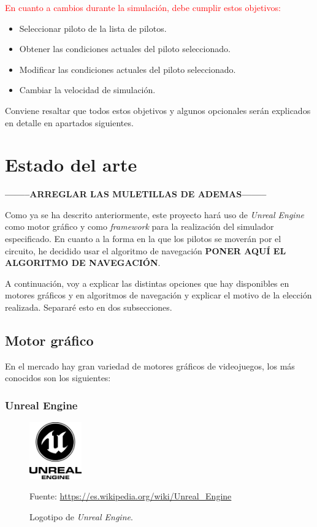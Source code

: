 \documentclass[a4paper,11pt]{book}
\begin{document}
\bigskip

\textcolor{red}{En cuanto a cambios durante la simulación, debe cumplir estos objetivos:}

\begin{itemize}
   \item Seleccionar piloto de la lista de pilotos.
   \item Obtener las condiciones actuales del piloto seleccionado.
   \item Modificar las condiciones actuales del piloto seleccionado.
   \item Cambiar la velocidad de simulación.
\end{itemize}

Conviene resaltar que todos estos objetivos y algunos opcionales serán explicados en detalle en apartados siguientes.

\section{Estado del arte}
\textbf{--------ARREGLAR LAS MULETILLAS DE ADEMAS--------} 
\bigskip

Como ya se ha descrito anteriormente, este proyecto hará uso de \textit{Unreal Engine} como motor gráfico y como \textit{framework} para la realización del simulador especificado. En cuanto a la forma en la que los pilotos se moverán por el circuito, he decidido usar el algoritmo de navegación \textbf{PONER AQUÍ EL ALGORITMO DE NAVEGACIÓN}.

\bigskip

A continuación, voy a explicar las distintas opciones que hay disponibles en motores gráficos y en algoritmos de navegación y explicar el motivo de la elección realizada. Separaré esto en dos subsecciones.

\subsection{Motor gráfico}
En el mercado hay gran variedad de motores gráficos de videojuegos, los más conocidos son los siguientes:

\subsubsection{Unreal Engine}

\begin{figure}[H]
   \centering
   \includegraphics[width=0.2\textwidth]{imagenes/UE_LOGO.png}
   \caption{Logotipo de \textit{Unreal Engine}.}
   \vspace{10pt}
   \footnotesize{Fuente: \url{https://es.wikipedia.org/wiki/Unreal_Engine}}
\end{figure}
\end{document}
